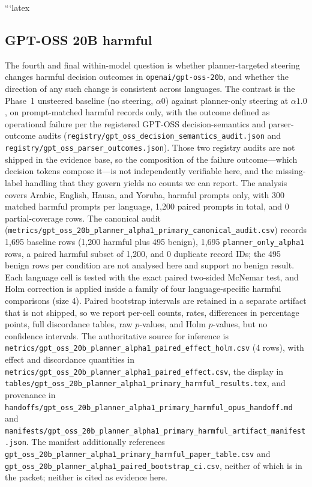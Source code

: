```latex
\subsection{GPT-OSS 20B harmful}

The fourth and final within-model question is whether planner-targeted steering
changes harmful decision outcomes in \texttt{openai/gpt-oss-20b}, and whether the
direction of any such change is consistent across languages. The contrast is the
Phase~1 unsteered baseline (no steering, $\alpha0$) against planner-only steering
at $\alpha1.0$, on prompt-matched harmful records only, with the outcome defined
as operational failure per the registered GPT-OSS decision-semantics and
parser-outcome audits (\texttt{registry/gpt\_oss\_decision\_semantics\_audit.json}
and \texttt{registry/gpt\_oss\_parser\_outcomes.json}). Those two registry audits
are not shipped in the evidence base, so the composition of the failure
outcome---which decision tokens compose it---is not independently verifiable
here, and the missing-label handling that they govern yields no counts we can
report. The analysis covers Arabic, English, Hausa, and Yoruba, harmful prompts
only, with 300 matched harmful prompts per language, 1{,}200 paired prompts in
total, and 0 partial-coverage rows. The canonical audit
(\texttt{metrics/gpt\_oss\_20b\_planner\_alpha1\_primary\_canonical\_audit.csv})
records 1{,}695 baseline rows (1{,}200 harmful plus 495 benign), 1{,}695
\texttt{planner\_only\_alpha1} rows, a paired harmful subset of 1{,}200, and 0
duplicate record IDs; the 495 benign rows per condition are not analysed here and
support no benign result. Each language cell is tested with the exact paired
two-sided McNemar test, and Holm correction is applied inside a family of four
language-specific harmful comparisons (size 4). Paired bootstrap intervals are
retained in a separate artifact that is not shipped, so we report per-cell
counts, rates, differences in percentage points, full discordance tables, raw
$p$-values, and Holm $p$-values, but no confidence intervals. The authoritative
source for inference is
\texttt{metrics/gpt\_oss\_20b\_planner\_alpha1\_paired\_effect\_holm.csv}
(4 rows), with effect and discordance quantities in
\texttt{metrics/gpt\_oss\_20b\_planner\_alpha1\_paired\_effect.csv}, the display
in
\texttt{tables/gpt\_oss\_20b\_planner\_alpha1\_primary\_harmful\_results.tex},
and provenance in
\texttt{handoffs/gpt\_oss\_20b\_planner\_alpha1\_primary\_harmful\_opus\_handoff.md}
and
\texttt{manifests/gpt\_oss\_20b\_planner\_alpha1\_primary\_harmful\_artifact\_manifest.json}.
The manifest additionally references
\texttt{gpt\_oss\_20b\_planner\_alpha1\_primary\_harmful\_paper\_table.csv} and
\texttt{gpt\_oss\_20b\_planner\_alpha1\_paired\_bootstrap\_ci.csv}, neither of
which is in the packet; neither is cited as evidence here.

